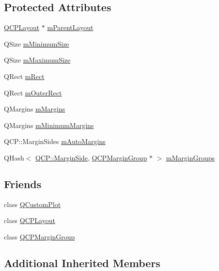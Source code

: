 \subsection*{Protected Attributes}
\begin{DoxyCompactItemize}
\item 
\hyperlink{classQCPLayout}{Q\+C\+P\+Layout} $\ast$ \hyperlink{classQCPLayoutElement_ae7c75c25549608bd688bdb65d4c38066}{m\+Parent\+Layout}
\item 
Q\+Size \hyperlink{classQCPLayoutElement_affef747c81632de33f08483b7fd10d01}{m\+Minimum\+Size}
\item 
Q\+Size \hyperlink{classQCPLayoutElement_a64a387973fd4addac842028c89088998}{m\+Maximum\+Size}
\item 
Q\+Rect \hyperlink{classQCPLayoutElement_ad8896f05550389f7b9e92c9e6cdf6e01}{m\+Rect}
\item 
Q\+Rect \hyperlink{classQCPLayoutElement_a07bb4973379e75cb0fa5b032c1d24afd}{m\+Outer\+Rect}
\item 
Q\+Margins \hyperlink{classQCPLayoutElement_ac2a32b99ee527ca5dfff9da03628fe94}{m\+Margins}
\item 
Q\+Margins \hyperlink{classQCPLayoutElement_a5ba71f25d1af4bb092b28df618538e63}{m\+Minimum\+Margins}
\item 
Q\+C\+P\+::\+Margin\+Sides \hyperlink{classQCPLayoutElement_af61c70354d1275778d68206b2a1b2d36}{m\+Auto\+Margins}
\item 
Q\+Hash$<$ \hyperlink{namespaceQCP_a7e487e3e2ccb62ab7771065bab7cae54}{Q\+C\+P\+::\+Margin\+Side}, \hyperlink{classQCPMarginGroup}{Q\+C\+P\+Margin\+Group} $\ast$ $>$ \hyperlink{classQCPLayoutElement_aeafbbc1130e02eee663c5326761fc963}{m\+Margin\+Groups}
\end{DoxyCompactItemize}
\subsection*{Friends}
\begin{DoxyCompactItemize}
\item 
class \hyperlink{classQCPLayoutElement_a1cdf9df76adcfae45261690aa0ca2198}{Q\+Custom\+Plot}
\item 
class \hyperlink{classQCPLayoutElement_a588aac0a0d721f6c5f10126d8596a20f}{Q\+C\+P\+Layout}
\item 
class \hyperlink{classQCPLayoutElement_ad077a686e85ab6fa03dcb2fd37fc499a}{Q\+C\+P\+Margin\+Group}
\end{DoxyCompactItemize}
\subsection*{Additional Inherited Members}


